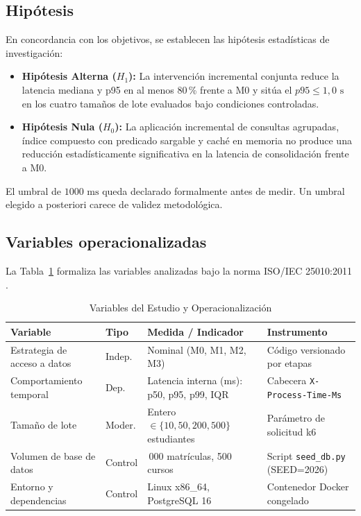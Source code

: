 \documentclass[conference]{IEEEtran}
\begin{document}
\subsection{Hipótesis}
En concordancia con los objetivos, se establecen las hipótesis estadísticas de investigación:
\begin{itemize}
    \setlength{\itemsep}{1pt}
    \setlength{\parskip}{0pt}
    \item \textbf{Hipótesis Alterna ($H_1$):} La intervención incremental conjunta reduce la latencia mediana y p95 en al menos 80\,\% frente a M0 y sitúa el $p95 \le 1,0\text{ s}$ en los cuatro tamaños de lote evaluados bajo condiciones controladas.
    \item \textbf{Hipótesis Nula ($H_0$):} La aplicación incremental de consultas agrupadas, índice compuesto con predicado sargable y caché en memoria no produce una reducción estadísticamente significativa en la latencia de consolidación frente a M0.
\end{itemize}
El umbral de $1000\text{ ms}$ queda declarado formalmente antes de medir. Un umbral elegido a posteriori carece de validez metodológica.

\subsection{Variables operacionalizadas}
La Tabla~\ref{tab:variables} formaliza las variables analizadas bajo la norma ISO/IEC 25010:2011 \cite{ISO25010}.

\begin{table}[!ht]
\centering
\caption{Variables del Estudio y Operacionalización}
\label{tab:variables}
\scriptsize
\setlength{\tabcolsep}{1.8pt}
\begin{tabularx}{\columnwidth}{|>{\raggedright\arraybackslash}p{2.1cm}|>{\raggedright\arraybackslash}p{1.2cm}|>{\raggedright\arraybackslash}X|>{\raggedright\arraybackslash}p{1.9cm}|}
\hline
\textbf{Variable} & \textbf{Tipo} & \textbf{Medida / Indicador} & \textbf{Instrumento} \\
\hline
Estrategia de acceso a datos & Indep. & Nominal (M0, M1, M2, M3) & Código versionado por etapas \\
\hline
Comportamiento temporal & Dep. & Latencia interna (ms): p50, p95, p99, IQR & Cabecera \texttt{X-Process-Time-Ms} \\
\hline
Tamaño de lote & Moder. & Entero $\in \{10, 50, 200, 500\}$ estudiantes & Parámetro de solicitud k6 \\
\hline
Volumen de base de datos & Control & 200\,000 matrículas, 500 cursos & Script \texttt{seed\_db.py} (SEED=2026) \\
\hline
Entorno y dependencias & Control & Linux x86\_64, PostgreSQL 16 & Contenedor Docker congelado \\
\hline
\end{tabularx}
\end{table}
\end{document}
